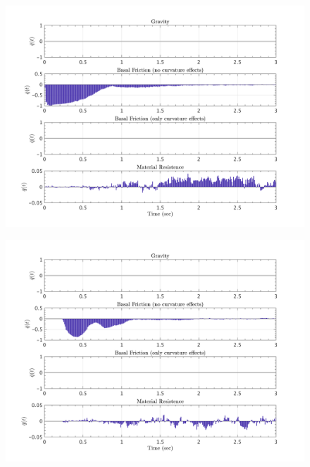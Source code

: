 \documentclass{article}
\begin{document}
\begin{figure}[H]
        \begin{minipage}[b]{0.5\linewidth}
                \centering
                \includegraphics[width=1\textwidth]{InclinedPlane/LocalRecords/ContribF1_P_y.png}
                \label{fig:Ramp-Py1}
        \end{minipage}
        \begin{minipage}[b]{0.5\linewidth}
                \centering
                \includegraphics[width=1\textwidth]{InclinedPlane/LocalRecords/ContribF8_P_y.png}
                \label{fig:Ramp-Py2}
        \end{minipage}


\end{figure}
\end{document}
